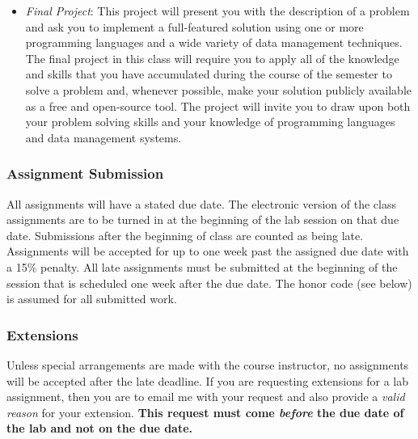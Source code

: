 \documentclass[11pt]{article} %
\begin{document}
\begin{itemize}

  \item {\em Final Project}: This project will present you with the description of a problem and ask you to implement a full-featured solution using one or more programming languages and a wide variety of data management techniques. The final project in this class will require you to apply all of the knowledge and skills that you have accumulated during the course of the semester to solve a problem and, whenever possible, make your solution publicly available as a free and open-source tool. The project will invite you to draw upon both your problem solving skills and your knowledge of programming languages and data management systems. %

\end{itemize}

\subsubsection*{\textbf{Assignment Submission}}

All assignments will have a stated due date. \color{red} The electronic version of the class assignments are to be turned in at the beginning of the lab session on that due date. Submissions after the beginning of class are counted as being late. \color{black}  Assignments will be accepted for up to one week past the assigned due date with a 15\% penalty. All late assignments must be submitted at the beginning of the session that is scheduled one week after the due date. The honor code (see below) is assumed for all submitted work.


  
\subsubsection*{\textbf{Extensions}}
Unless special arrangements are made with the course instructor, no assignments will be accepted after the late deadline. If you are requesting extensions for a lab assignment, then you are to email me with your request and also provide a \emph{valid reason} for your extension. \textbf{This request must come \emph{before} the due date of the lab and not on the due date.}
\end{document}
